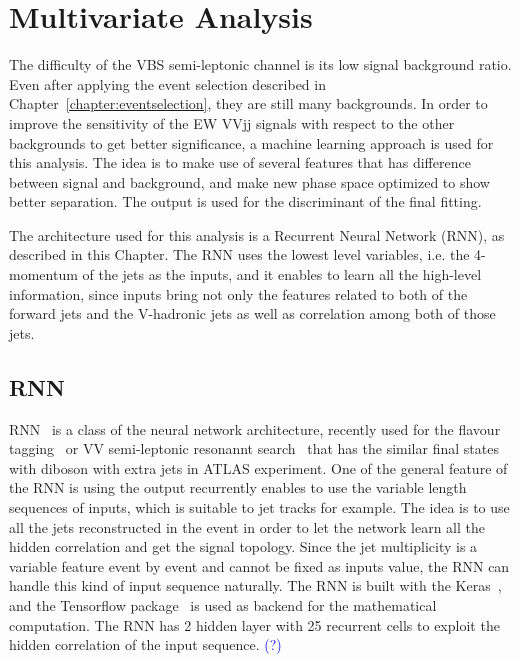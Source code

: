 \chapter{Multivariate Analysis}
\label{chap:MVA}

The difficulty of the VBS semi-leptonic channel is its low signal background ratio. Even after applying the event selection described in Chapter~\ref{chapter:eventselection}, they are still many backgrounds. In order to improve the sensitivity of the EW VVjj signals with respect to the other backgrounds to get better significance, a machine learning approach is used for this analysis.
The idea is to make use of several features that has difference between signal and background, and make new phase space optimized to show better separation. The output is used for the discriminant of the final fitting.

The architecture used for this analysis is a Recurrent Neural Network (RNN), as described in this Chapter.
The RNN uses the lowest level variables, i.e. the 4-momentum of the jets as the inputs, and it enables to learn all the high-level information, since inputs bring not only the features related to both of the forward jets and the V-hadronic jets as well as correlation among both of those jets.

\section{RNN}
RNN~\cite{Sherstinsky_2020} is a class of the neural network architecture, recently used for the flavour tagging~\cite{ATL-PHYS-PUB-2017-003} or VV semi-leptonic resonannt search~\cite{HDBS-2018-10} that has the similar final states with diboson  with extra jets in ATLAS experiment.
One of the general feature of the RNN is using the output recurrently enables to use the variable length sequences of inputs, which is suitable to jet tracks for example.
The idea is to use all the jets reconstructed in the event in order to let the network learn all the hidden correlation and get the signal topology.
Since the jet multiplicity is a variable feature event by event and cannot be fixed as inputs value, the RNN can handle this kind of input sequence naturally.
The RNN is built with the Keras~\cite{chollet2015keras}, and the Tensorflow package~\cite{tensorflow2015-whitepaper} is used as backend for the mathematical computation. The RNN has 2 hidden layer with 25 recurrent cells to exploit the hidden correlation of the input sequence. \textcolor{blue}{(?)}

